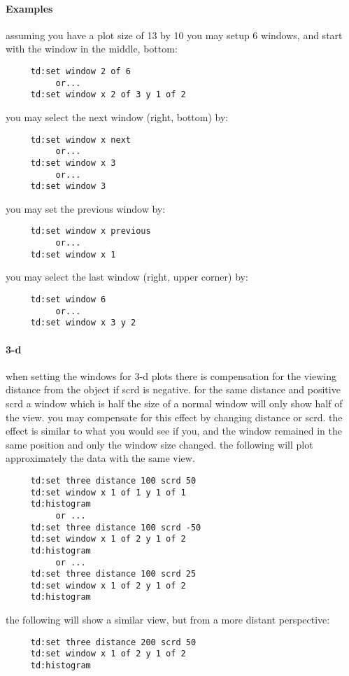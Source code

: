 \paragraph{Examples}
assuming  you  have  a plot size of 13 by 10 you may setup 6 windows,
and start with the window in the middle, bottom:  
\begin{verbatim}
     td:set window 2 of 6 
          or...  
     td:set window x 2 of 3 y 1 of 2 
\end{verbatim}
you may select the next window (right, bottom) by:  
\begin{verbatim}
     td:set window x next 
          or...  
     td:set window x 3 
          or...  
     td:set window 3 
\end{verbatim}
you may set the previous window by:  
\begin{verbatim}
     td:set window x previous 
          or...  
     td:set window x 1 
\end{verbatim}
you may select the last window (right, upper corner) by:  
\begin{verbatim}
     td:set window 6 
          or...  
     td:set window x 3 y 2 
\end{verbatim}
\paragraph{3-d}
when  setting the windows for 3-d plots there is compensation for the
viewing distance from the object if scrd is negative.  for  the  same
distance  and  positive  scrd  a  window  which is half the size of a
normal window will only show half of the view.   you  may  compensate
for  this effect by changing distance or scrd.  the effect is similar
to what you would see if you, and the window  remained  in  the  same
position  and  only the window size changed.  the following will plot
approximately the data with the same view.  
\begin{verbatim}
     td:set three distance 100 scrd 50 
     td:set window x 1 of 1 y 1 of 1 
     td:histogram 
          or ...  
     td:set three distance 100 scrd -50 
     td:set window x 1 of 2 y 1 of 2 
     td:histogram 
          or ...  
     td:set three distance 100 scrd 25 
     td:set window x 1 of 2 y 1 of 2 
     td:histogram 
\end{verbatim}

the  following  will  show  a  similar  view, but from a more distant
perspective:  
\begin{verbatim}
     td:set three distance 200 scrd 50 
     td:set window x 1 of 2 y 1 of 2 
     td:histogram 
\end{verbatim}

